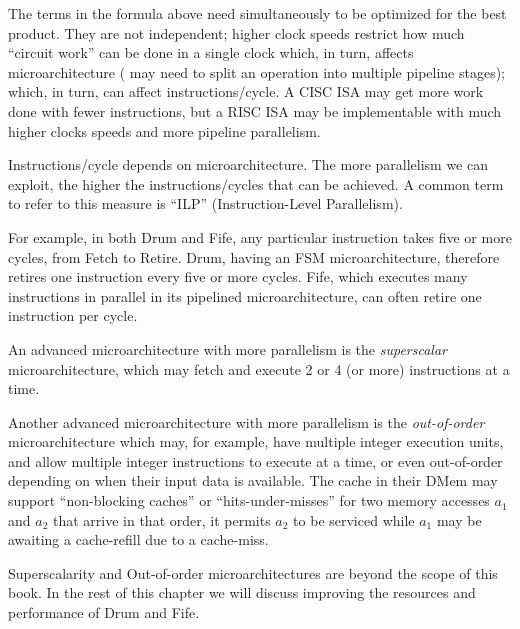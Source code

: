 The terms in the formula above need simultaneously to be optimized for
the best product.  They are not independent; higher clock speeds
restrict how much ``circuit work'' can be done in a single clock
which, in turn, affects microarchitecture ({\eg} may need to split an
operation into multiple pipeline stages); which, in turn, can affect
instructions/cycle.  A CISC ISA may get more work done with fewer
instructions, but a RISC ISA may be implementable with much higher
clocks speeds and more pipeline parallelism.

Instructions/cycle depends on microarchitecture.  The more parallelism
we can exploit, the higher the instructions/cycles that can be
achieved.  A common term to refer to this measure is ``ILP''
(Instruction-Level Parallelism).

For example, in both Drum and Fife, any particular instruction takes
five or more cycles, from Fetch to Retire.  Drum, having an FSM
microarchitecture, therefore retires one instruction every five or
more cycles.  Fife, which executes many instructions in parallel in
its pipelined microarchitecture, can often retire one instruction per
cycle.


An advanced microarchitecture with more parallelism is the
\emph{superscalar} microarchitecture, which may fetch and execute 2 or
4 (or more) instructions at a time.



Another advanced microarchitecture with more parallelism is the
\emph{out-of-order} microarchitecture which may, for example, have
multiple integer execution units, and allow multiple integer
instructions to execute at a time, or even out-of-order depending on
when their input data is available.  The cache in their DMem may
support ``non-blocking caches'' or ``hits-under-misses'' {\ie} for two
memory accesses $a_1$ and $a_2$ that arrive in that order, it permits
$a_2$ to be serviced while $a_1$ may be awaiting a cache-refill due to
a cache-miss.

Superscalarity and Out-of-order microarchitectures are beyond the
scope of this book.  In the rest of this chapter we will discuss
improving the resources and performance of Drum and Fife.

